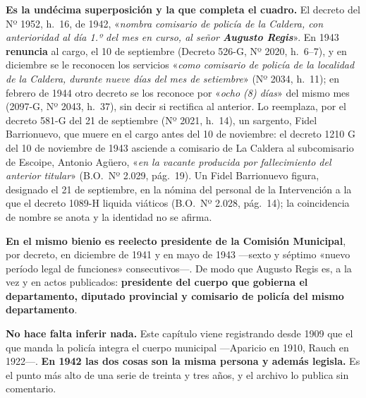 \begin{cautela}
\textbf{Es la undécima superposición y la que completa el cuadro.} El decreto
del Nº 1952, h.\ 16, de 1942, «\textit{nombra comisario de policía de la
Caldera, con anterioridad al día 1.º del mes en curso, al señor \textbf{Augusto
Regis}}». En 1943 \textbf{renuncia} al cargo, el 10 de septiembre (Decreto 526-G,
Nº 2020, h.\ 6--7), y en diciembre se le reconocen los servicios «\textit{como
comisario de policía de la localidad de la Caldera, durante nueve días del mes
de setiembre}» (Nº 2034, h.\ 11); en febrero de 1944 otro decreto se los reconoce por
«\textit{ocho (8) días}» del mismo mes (2097-G, Nº 2043, h.\ 37), sin decir si rectifica al
anterior. Lo reemplaza, por el decreto 581-G del 21 de septiembre (Nº 2021, h.\ 14), un
sargento, Fidel Barrionuevo, que muere en el cargo antes del 10 de noviembre: el decreto 1210 G del 10
de noviembre de 1943 asciende a comisario de La Caldera al subcomisario de Escoipe, Antonio
Agüero, «\textit{en la vacante producida por fallecimiento del anterior titular}» (B.O.\ Nº
2.029, pág.\ 19). Un Fidel Barrionuevo figura, designado el 21 de septiembre, en la nómina del
personal de la Intervención a la que el decreto 1089-H liquida viáticos (B.O.\ Nº 2.028,
pág.\ 14); la coincidencia de nombre se anota y la identidad no se afirma.

\textbf{En el mismo bienio es reelecto presidente de la Comisión Municipal}, por
decreto, en diciembre de 1941 y en mayo de 1943 ---sexto y séptimo «nuevo período legal de
funciones» consecutivos---. De modo que Augusto Regis es, a la vez y en actos
publicados: \textbf{presidente del cuerpo que gobierna el departamento,
diputado provincial y comisario de policía del mismo departamento}.

\textbf{No hace falta inferir nada.} Este capítulo viene registrando desde 1909
que el que manda la policía integra el cuerpo municipal ---Aparicio
en 1910, Rauch en 1922---. \textbf{En 1942 las dos cosas son la misma persona y
además legisla.} Es el punto más alto de una serie de treinta y tres años, y el
archivo lo publica sin comentario.
\end{cautela}

